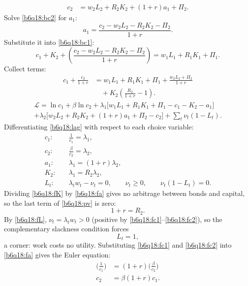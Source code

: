 \begin{sol}
\begin{align}
c_2&=w_2L_2+R_2K_2+(1+r)a_1+\Pi_2. \label{b6q18:bc2}
\end{align}
Solve \eqref{b6q18:bc2} for $a_1$:
\[
a_1=\frac{c_2-w_2L_2-R_2K_2-\Pi_2}{1+r}.
\]
Substitute it into \eqref{b6q18:bc1}:
\[
c_1+K_2+\left(\frac{c_2-w_2L_2-R_2K_2-\Pi_2}{1+r}\right)=w_1L_1+R_1K_1+\Pi_1 .
\]
Collect terms:
\begin{align}
c_1+\frac{c_2}{1+r}&=w_1L_1+R_1K_1+\Pi_1+\frac{w_2L_2+\Pi_2}{1+r}\nonumber\\
&\quad+K_2\left(\frac{R_2}{1+r}-1\right). \label{b6q18:pv}
\end{align}
\begin{multline}
\mathcal L=\ln c_1+\beta\ln c_2+\lambda_1\big[w_1L_1+R_1K_1+\Pi_1-c_1-K_2-a_1\big]\\
+\lambda_2\big[w_2L_2+R_2K_2+(1+r)a_1+\Pi_2-c_2\big]+\textstyle\sum_t\nu_t(1-L_t). \label{b6q18:lag}
\end{multline}
Differentiating \eqref{b6q18:lag} with respect to each choice variable:
\begin{align}
c_1:&\quad \frac1{c_1}=\lambda_1, \label{b6q18:fc1}\\
c_2:&\quad \frac\beta{c_2}=\lambda_2, \label{b6q18:fc2}\\
a_1:&\quad \lambda_1=(1+r)\lambda_2, \label{b6q18:fa}\\
K_2:&\quad \lambda_1=R_2\lambda_2, \label{b6q18:fK}\\
L_t:&\quad \lambda_tw_t-\nu_t=0,\qquad \nu_t\ge0,\qquad \nu_t(1-L_t)=0. \label{b6q18:fL}
\end{align}
Dividing \eqref{b6q18:fK} by \eqref{b6q18:fa} gives no arbitrage between bonds and capital, so the last term of \eqref{b6q18:pv} is zero:
\begin{equation}
1+r=R_2. \label{b6q18:noarb}
\end{equation}
By \eqref{b6q18:fL}, $\nu_t=\lambda_tw_t>0$ (positive by \eqref{b6q18:fc1}--\eqref{b6q18:fc2}), so the complementary slackness condition forces
\begin{equation}
L_t=1, \label{b6q18:L}
\end{equation}
a corner: work costs no utility. Substituting \eqref{b6q18:fc1} and \eqref{b6q18:fc2} into \eqref{b6q18:fa} gives the Euler equation:
\begin{align}
\Big(\frac1{c_1}\Big)&=(1+r)\Big(\frac\beta{c_2}\Big)\nonumber\\
c_2&=\beta(1+r)c_1. \label{b6q18:euler}

\end{align}
\end{sol}
